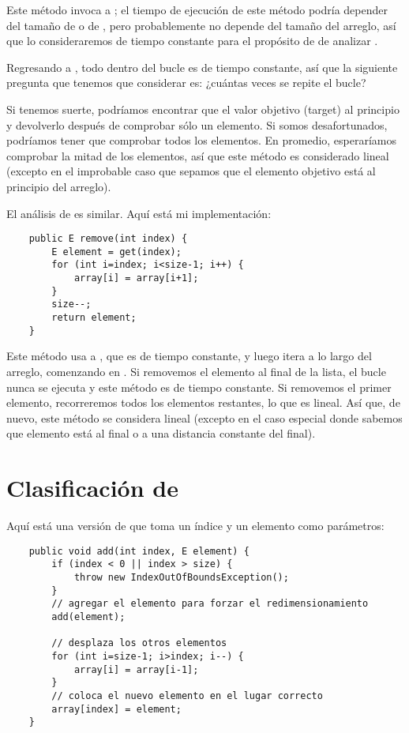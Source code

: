 \documentclass[12pt]{book}
\theoremstyle{exercise}
\begin{document}
Este método invoca a ; el tiempo de ejecución de este
método podría depender del tamaño de  o de , pero
probablemente no depende del tamaño del arreglo, así que lo consideraremos
de tiempo constante para el propósito de de analizar .


Regresando a , todo dentro del bucle es de tiempo constante, 
así que la siguiente pregunta que tenemos que considerar es: ¿cuántas veces
se repite el bucle?

Si tenemos suerte, podríamos encontrar que el valor objetivo (target) al
principio y devolverlo después de comprobar sólo un elemento. Si somos
desafortunados, podríamos tener que comprobar todos los elementos. En
promedio, esperaríamos comprobar la mitad de los elementos, así que este
método es considerado lineal (excepto en el improbable caso que
sepamos que el elemento objetivo está al principio del arreglo).


El análisis de  es similar. Aquí está mi implementación:

\begin{verbatim}
    public E remove(int index) {
        E element = get(index);
        for (int i=index; i<size-1; i++) {
            array[i] = array[i+1];
        }
        size--;
        return element;
    }
\end{verbatim}

Este método usa a , que es de tiempo constante, y luego itera a lo
largo del arreglo, comenzando en . Si removemos el elemento al final
de la lista, el bucle nunca se ejecuta y este método es de tiempo constante. Si
removemos el primer elemento, recorreremos todos los elementos restantes, lo
que es lineal. Así que, de nuevo, este método se considera lineal (excepto en el
caso especial donde sabemos que elemento está al final o a una distancia constante
del final).


\section{Clasificación de }
\label{classifying-add}

Aquí está una versión de  que toma un índice y un elemento como parámetros:

\begin{verbatim}
    public void add(int index, E element) {
        if (index < 0 || index > size) {
            throw new IndexOutOfBoundsException();
        }
        // agregar el elemento para forzar el redimensionamiento
        add(element);
        
        // desplaza los otros elementos
        for (int i=size-1; i>index; i--) {
            array[i] = array[i-1];
        }
        // coloca el nuevo elemento en el lugar correcto
        array[index] = element;
    }
\end{verbatim}
\end{document}
